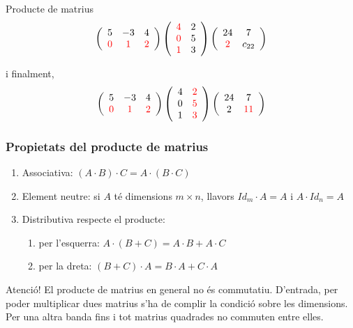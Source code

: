 \documentclass{beamer}
\begin{document}
\begin{frame}
\begin{exampleblock}{Producte de matrius}
$$\left(\begin{array}{ccc}
5 & -3 & 4\\
{\color{red}0} & {\color{red}1} & {\color{red}2}\end{array}\right)\left(\begin{array}{cc}
{\color{red}4} & 2\\
{\color{red}0} & 5\\
{\color{red}1} & 3\end{array}\right)\left(\begin{array}{cc}
24 & 7\\
{\color{red}2} & c_{22}\end{array}\right)$$

i finalment, $$\left(\begin{array}{ccc}
5 & -3 & 4\\
{\color{red}0} & {\color{red}1} & {\color{red}2}\end{array}\right)\left(\begin{array}{cc}
4 & {\color{red}2}\\
0 & {\color{red}5}\\
1 & {\color{red}3}\end{array}\right)\left(\begin{array}{cc}
24 & 7\\
2 & {\color{red}11}\end{array}\right)$$
\end{exampleblock}
\end{frame}
\begin{frame}\frametitle{Propietats del producte de matrius}
\begin{enumerate}
\item
Associativa: $(A\cdot B)\cdot C=A\cdot(B\cdot C)$
\item
Element neutre: si $A$ té dimensions $m\times n$, llavors $Id_{m}\cdot A=A$ i $A\cdot Id_{n}=A$
\item
Distributiva respecte el producte:
\begin{enumerate}
\item
per l'esquerra: $A\cdot(B+C)=A\cdot B+A\cdot C$
\item
per la dreta: $(B+C)\cdot A=B\cdot A+C\cdot A$
\end{enumerate}
\end{enumerate}
\begin{alertblock}{Atenció!}
El producte de matrius en general no és commutatiu. D'entrada, per poder multiplicar dues matrius s'ha de complir la condició sobre les dimensions. Per una altra banda fins i tot matrius quadrades no commuten entre elles.
\end{alertblock}
\end{frame}
\end{document}
